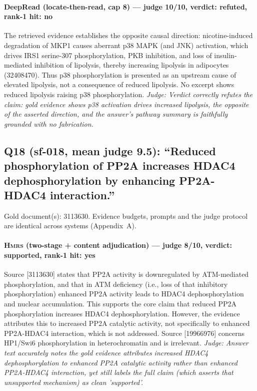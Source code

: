 \documentclass[sigconf, review, anonymous]{acmart}
\begin{document}
\paragraph{DeepRead (locate-then-read, cap 8) --- judge 10/10, verdict: refuted, rank-1 hit: no}
\noindent The retrieved evidence establishes the opposite causal direction: nicotine-induced degradation of MKP1 causes aberrant p38 MAPK (and JNK) activation, which drives IRS1 serine-307 phosphorylation, PKB inhibition, and loss of insulin-mediated inhibition of lipolysis, thereby increasing lipolysis in adipocytes (32408470). Thus p38 phosphorylation is presented as an upstream cause of elevated lipolysis, not a consequence of reduced lipolysis. No excerpt shows reduced lipolysis raising p38 phosphorylation.
\noindent\small\textit{Judge: Verdict correctly refutes the claim: gold evidence shows p38 activation drives increased lipolysis, the opposite of the asserted direction, and the answer's pathway summary is faithfully grounded with no fabrication.}

\subsection{Q18 (sf-018, mean judge 9.5): ``Reduced phosphorylation of PP2A increases HDAC4 dephosphorylation by enhancing PP2A-HDAC4 interaction.''}
\label{app:q18}
\noindent Gold document(s): 3113630. Evidence budgets, prompts and the judge protocol are identical across systems (Appendix~A).
\paragraph{\textbf{\textsc{Hmrs}} (two-stage + content adjudication) --- judge 8/10, verdict: supported, rank-1 hit: yes}
\noindent Source [3113630] states that PP2A activity is downregulated by ATM-mediated phosphorylation, and that in ATM deficiency (i.e., loss of that inhibitory phosphorylation) enhanced PP2A activity leads to HDAC4 dephosphorylation and nuclear accumulation. This supports the core claim that reduced PP2A phosphorylation increases HDAC4 dephosphorylation. However, the evidence attributes this to increased PP2A catalytic activity, not specifically to enhanced PP2A-HDAC4 interaction, which is not addressed. Source [19966976] concerns HP1/Swi6 phosphorylation in heterochromatin and is irrelevant.
\noindent\small\textit{Judge: Answer text accurately notes the gold evidence attributes increased HDAC4 dephosphorylation to enhanced PP2A catalytic activity rather than enhanced PP2A-HDAC4 interaction, yet still labels the full claim (which asserts that unsupported mechanism) as clean 'supported'.}
\end{document}
